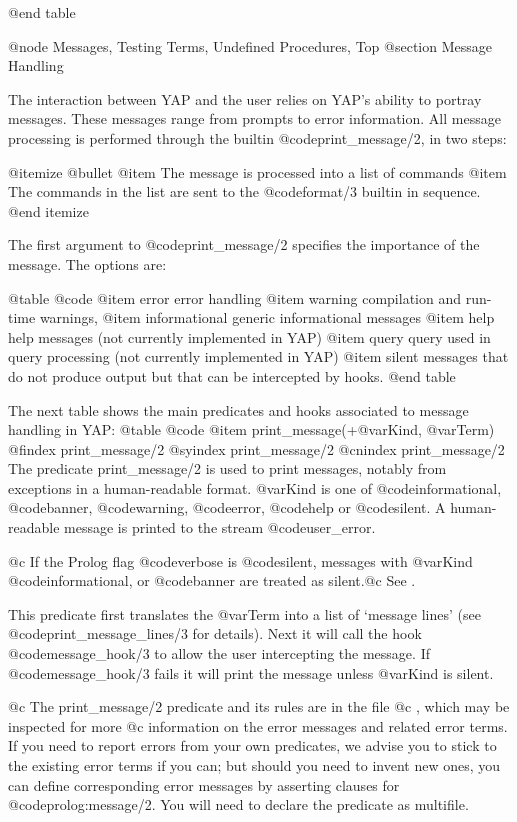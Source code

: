 {{{{@end table

@node Messages, Testing Terms, Undefined Procedures, Top
@section Message Handling

The interaction between YAP and the user relies on YAP's ability to
portray messages. These messages range from prompts to error
information. All message processing is performed through the builtin
@code{print_message/2}, in two steps:

@itemize @bullet
@item The message is processed into a list of commands 
@item The commands in the list are sent to the @code{format/3} builtin
in sequence.
@end itemize 

The first argument to @code{print_message/2} specifies the importance of
the message. The options are:

@table @code
@item error
error handling
@item warning
compilation and run-time warnings,
@item informational
generic informational messages
@item help 
help messages (not currently implemented in YAP)
@item query
query 	used in query processing (not currently implemented in YAP)
@item  silent
messages that do not produce output but that can be intercepted by hooks.
@end table

The next table shows the main predicates and hooks associated to message
handling in YAP:
@table @code
@item print_message(+@var{Kind}, @var{Term})
@findex print_message/2
@syindex print_message/2
@cnindex print_message/2
The predicate print_message/2 is used to print messages, notably from
exceptions in a human-readable format. @var{Kind} is one of
@code{informational}, @code{banner}, @code{warning}, @code{error},
@code{help} or @code{silent}. A human-readable message is printed to
the stream @code{user_error}.

@c %
If the Prolog flag @code{verbose} is @code{silent}, messages with
@var{Kind} @code{informational}, or @code{banner} are treated as
silent.@c  See .

This predicate first translates the @var{Term} into a list of `message
lines' (see @code{print_message_lines/3} for details).  Next it will
call the hook @code{message_hook/3} to allow the user intercepting the
message.  If @code{message_hook/3} fails it will print the message unless
@var{Kind} is silent.

@c The print_message/2 predicate and its rules are in the file
@c , which may be inspected for more
@c information on the error messages and related error terms. 
If you need to report errors from your own predicates, we advise you to
stick to the existing error terms if you can; but should you need to
invent new ones, you can define corresponding error messages by
asserting clauses for @code{prolog:message/2}. You will need to declare
the predicate as multifile.

}}}}

